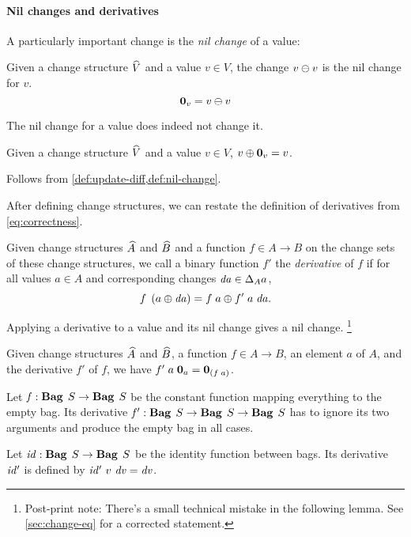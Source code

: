 \paragraph{Nil changes and derivatives}
A particularly important change is the \emph{nil change} of a value:
\begin{definition}
  \label{def:nil-change}
  Given a change structure $\widehat{V}$ and a value $v \in V$, the change
  $\Diff{v}{v}$ is the nil change for $v$.
  \[
    \NilC{v} = \Diff{v}{v} \qed
  \]
\end{definition}
The nil change for a value does indeed not change it.
\begin{lemma}
  \label{thm:update-nil}
  Given a change structure $\widehat{V}$ and a value $v \in V$,
  $\Apply{\NilC{v}}{v} = v$.
\end{lemma}

\begin{optionalproof}
Follows from \cref{def:update-diff,def:nil-change}.
\end{optionalproof}

After defining change structures, we can restate the definition of derivatives from \cref{eq:correctness}.

\begin{definition}[Derivatives]
  \label{def:derivatives}
  Given change structures $\widehat{A}$ and $\widehat{B}$ and a function $f \in A \to
  B$ on the change sets of these change structures, we call a binary function $f'$ the \emph{derivative} of $f$ if
  for all values $a \in A$ and corresponding changes $\D a \in
  \Change[A]{a}$,
  \[\App{f}{\Apply*{\D a}{a}} = \Apply{\App{\App{f'}{a}}{\D a}}{\App{f}{a}}\text{.}\qed\]
\end{definition}

Applying a derivative to a value and its nil change gives a nil
change.%
\footnote{Post-print note: There's a small technical mistake in
  the following lemma. See \cref{sec:change-eq} for a corrected
  statement.}
%
\begin{lemma}
  \label{thm:deriv-nil}
  Given change structures $\widehat{A}$ and
  $\widehat{B}$, a function $f \in A \to B$, an element $a$
  of $A$, and the derivative $f'$ of $f$, we have
  $\App{\App{f'}{a}}{\NilC{a}} = \NilC{\App* f a}$.
\end{lemma}

\begin{examples}
Let $\Term{f}:\Fun{\Bag S}{\Bag S}$ be the constant function mapping
everything to the empty bag. Its derivative
$\Term{f'}:\Fun{\Bag S}{\Fun{\Bag S}{\Bag S}}$ has to ignore its two
arguments and produce the empty bag in all cases.

Let $\Term{id}:\Fun{\Bag S}{\Bag S}$ be the identity function between
bags. Its derivative $\mathit{id'}$ is defined by
$\mathit{id'}~v~\mathit{dv} = \mathit{dv}$.
\end{examples}


